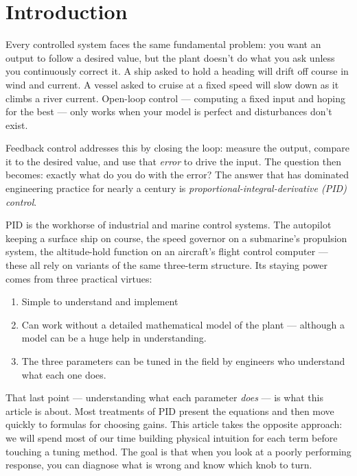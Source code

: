 \documentclass[../../book.tex]{subfiles}
\begin{document}
\graphicspath{{./}}

\section{Introduction}
\label{sec:intro}

Every controlled system faces the same fundamental problem: you want an output
to follow a desired value, but the plant doesn't do what you ask unless you
continuously correct it.  A ship asked to hold a heading will drift off course
in wind and current.  A vessel asked to cruise at a fixed speed will slow down
as it climbs a river current.  Open-loop control --- computing a fixed input
and hoping for the best --- only works when your model is perfect and
disturbances don't exist.

Feedback control addresses this by closing the loop: measure the output,
compare it to the desired value, and use that \emph{error} to drive the input.
The question then becomes: exactly what do you do with the error?  The answer
that has dominated engineering practice for nearly a century is
\emph{proportional-integral-derivative (PID) control}.

PID is the workhorse of industrial and marine control systems.  The autopilot
keeping a surface ship on course, the speed governor on a submarine's propulsion
system, the altitude-hold function on an aircraft's flight control computer ---
these all rely on variants of the same three-term structure.  Its staying power
comes from three practical virtues:
\begin{enumerate}
\item Simple to understand and implement
\item Can work without a detailed mathematical model of the plant --- although a
  model can be a huge help in understanding.
\item The three parameters can be tuned in the field by engineers who
  understand what each one does.
\end{enumerate}

That last point --- understanding what each parameter \emph{does} --- is what
this article is about.  Most treatments of PID present the equations and then
move quickly to formulas for choosing gains.  This article takes the opposite
approach: we will spend most of our time building physical intuition for each
term before touching a tuning method.  The goal is that when you look at a
poorly performing response, you can diagnose what is wrong and know which
knob to turn.
\end{document}
